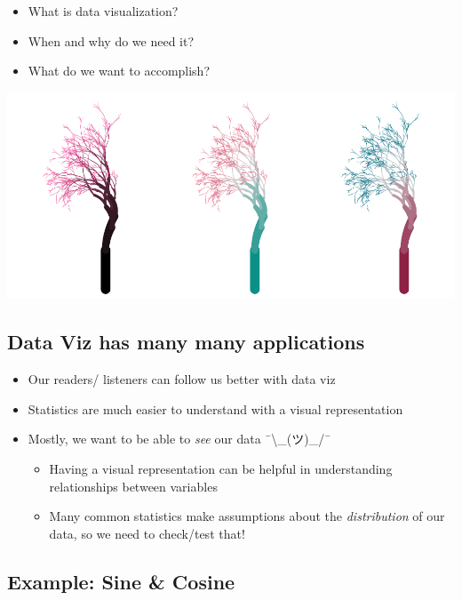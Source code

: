 \documentclass[
]{book}
\providecommand{\tightlist}{%
  \setlength{\itemsep}{0pt}\setlength{\parskip}{0pt}}
\begin{document}
\begin{itemize}
\tightlist
\item
  What is data visualization?
\item
  When and why do we need it?
\item
  What do we want to accomplish?
\end{itemize}

\includegraphics{_main_files/figure-latex/unnamed-chunk-41-1.pdf}

\subsection{\texorpdfstring{Data Viz has many many applications }{Data Viz has many many applications }}\label{data-viz-has-many-many-applications}

\begin{itemize}
\tightlist
\item
  Our readers/ listeners can follow us better with data viz
\item
  Statistics are much easier to understand with a visual representation
\item
  Mostly, we want to be able to \emph{see} our data ¯\textbackslash\_(ツ)\_/¯

  \begin{itemize}
  \tightlist
  \item
    Having a visual representation can be helpful in understanding relationships between variables
  \item
    Many common statistics make assumptions about the \emph{distribution} of our data, so we need to check/test that!
  \end{itemize}
\end{itemize}

\subsection{Example: Sine \& Cosine}\label{example-sine-cosine}
\end{document}
